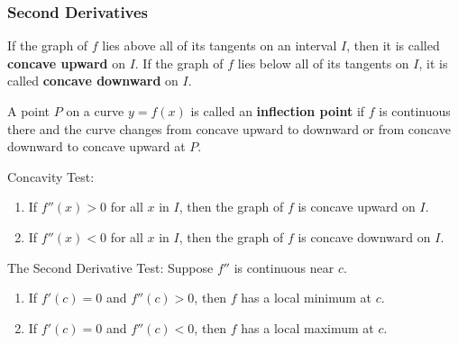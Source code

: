 \subsubsection*{Second Derivatives}
\begin{definition}
    If the graph of \(f\) lies above all of its tangents on an interval \(I\),
    then it is called \textbf{concave upward} on \(I\).
    If the graph of \(f\) lies below all of its tangents on \(I\), it is
    called \textbf{concave downward} on \(I\).
\end{definition}
\begin{definition}
    A point \(P\) on a curve \(y=f(x)\) is called an \textbf{inflection point}
    if \(f\) is continuous there and the curve changes from concave upward to
    downward or from concave downward to concave upward at \(P\).
\end{definition}
Concavity Test:
\begin{enumerate}
    \item If \(f''(x)>0\) for all \(x\) in \(I\), then the graph of \(f\) is
    concave upward on \(I\).
    \item If \(f''(x)<0\) for all \(x\) in \(I\), then the graph of \(f\) is
    concave downward on \(I\).
\end{enumerate}
The Second Derivative Test: Suppose \(f''\) is continuous near \(c\).
\begin{enumerate}
    \item If \(f'(c)=0\) and \(f''(c)>0\), then \(f\) has a local minimum at
    \(c\).
    \item If \(f'(c)=0\) and \(f''(c)<0\), then \(f\) has a local maximum at
    \(c\).
\end{enumerate}
